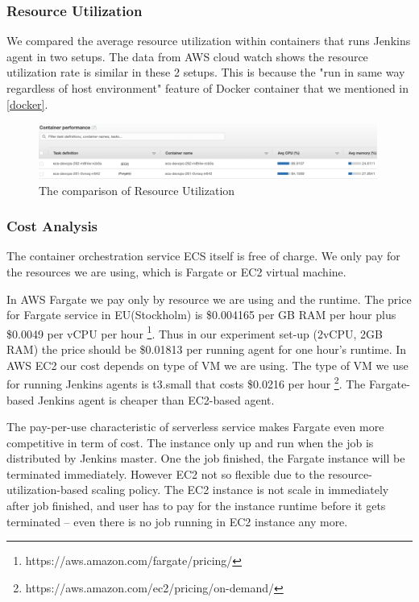 \subsubsection{Resource Utilization}
We compared the average resource utilization within containers that runs Jenkins agent in two setups. The data from AWS cloud watch shows the resource utilization rate is similar in these 2 setups. This is because the "run in same way regardless of host environment" \cite{WhatisaC60:online} feature of Docker container that we mentioned in \ref{docker}.
\begin{figure}[h]
    \centering
    \includegraphics[width=0.99\textwidth]{pics/utilizationecs.png}
    \caption{The comparison of Resource Utilization}
    \label{fig:utilizationecs}
\end{figure}
\subsubsection{Cost Analysis}
The container orchestration service ECS itself is free of charge. We only pay for the resources we are using, which is Fargate or EC2 virtual machine.
\par
In AWS Fargate we pay only by resource we are using and the runtime. The price for Fargate service in EU(Stockholm) is \$0.004165 per GB RAM per hour plus \$0.0049 per vCPU per hour \footnote{https://aws.amazon.com/fargate/pricing/}. Thus in our experiment set-up (2vCPU, 2GB RAM) the price should be \$0.01813 per running agent for one hour's runtime.
In AWS EC2 our cost depends on type of VM we are using. The type of VM we use for running Jenkins agents is t3.small that costs \$0.0216 per hour \footnote{https://aws.amazon.com/ec2/pricing/on-demand/}. The Fargate-based Jenkins agent is cheaper than EC2-based agent.
\par
The pay-per-use characteristic of serverless service makes Fargate even more competitive in term of cost. The instance only up and run when the job is distributed by Jenkins master. One the job finished, the Fargate instance will be terminated immediately. However EC2 not so flexible due to the resource-utilization-based scaling policy. The EC2 instance is not scale in immediately after job finished, and user has to pay for the instance runtime before it gets terminated -- even there is no job running in EC2 instance any more.
